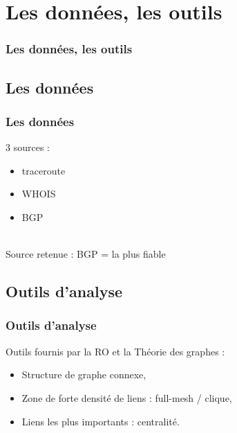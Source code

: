 \section{Les donn\'ees, les outils}

\begin{frame}
 	\frametitle{Les donn\'ees, les outils}
\end{frame}

\subsection{Les donn\'ees}
\frame
{
\frametitle{Les donn\'ees}
3 sources : \\
\begin{itemize}
 \item traceroute
 \item WHOIS
 \item BGP
\end{itemize}
~\\
Source retenue : BGP = la plus fiable
}

\subsection{Outils d'analyse}
\frame
{
\frametitle{Outils d'analyse}
Outils fournis par la RO et la Th\'eorie des graphes : \\
\begin{itemize}
 \item Structure de graphe connexe,
 \item Zone de forte densit\'e de liens : full-mesh / clique,
 \item Liens les plus importants : centralit\'e.
\end{itemize}
}

